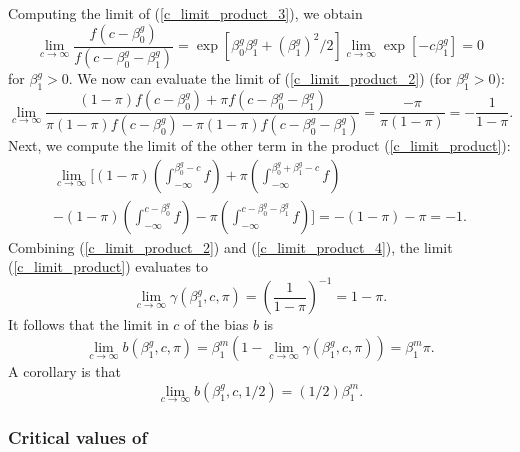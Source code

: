 \documentclass[12pt]{article}
\begin{document}
Computing the limit of (\ref{c_limit_product_3}), we obtain
$$
\lim_{c \to \infty} \frac{f(c - \beta^g_0)}{f(c - \beta^g_0 - \beta^g_1)} = \exp[ \beta^g_0 \beta^g_1 + (\beta^g_1)^2/2] \lim_{c \to \infty} \exp[ -c \beta^g_1] = 0
$$ for $\beta^g_1 > 0$. We now can evaluate the limit of (\ref{c_limit_product_2}) (for $\beta^g_1 > 0$):
$$ \lim_{c \to \infty} \frac{(1-\pi) f(c - \beta^g_0) + \pi f(c - \beta^g_0 - \beta^g_1)}{\pi (1-\pi) f(c - \beta^g_0) - \pi (1-\pi)f(c - \beta^g_0 - \beta^g_1)} = \frac{-\pi}{\pi(1-\pi)} = -\frac{1}{1 -\pi}.$$ Next, we compute the limit of the other term in the product (\ref{c_limit_product}):
\begin{multline}\label{c_limit_product_4}
\lim_{c \to \infty} \bigg[ (1-\pi)\left( \int_{-\infty}^{\beta_0^g - c} f \right) + \pi \left(\int_{-\infty}^{ \beta^g_0 + \beta^g_1 - c} f \right) \\ - (1-\pi)\left(\int_{-\infty}^{c - \beta^g_0} f \right) - \pi \left(\int_{-\infty}^{c - \beta_0^g - \beta_1^g} f \right) \bigg] = -(1-\pi) - \pi = -1.
\end{multline}
Combining (\ref{c_limit_product_2}) and (\ref{c_limit_product_4}), the limit (\ref{c_limit_product}) evaluates to
$$ \lim_{c \to \infty} \gamma(\beta^g_1, c, \pi) = \left(  \frac{ 1 }{ 1 - \pi }\right)^{-1} = 1 - \pi.$$ It follows that the limit in $c$ of the bias $b$ is
$$\lim_{c \to \infty} b(\beta^g_1, c, \pi) = \beta_1^m(1 - \lim_{c \to \infty} \gamma(\beta^g_1, c, \pi)) = \beta^m_1 \pi.$$
A corollary is that
$$\lim_{c \to \infty} b(\beta^g_1, c, 1/2) = (1/2)\beta^m_1.$$

\subsubsection{Critical values of }
\end{document}
